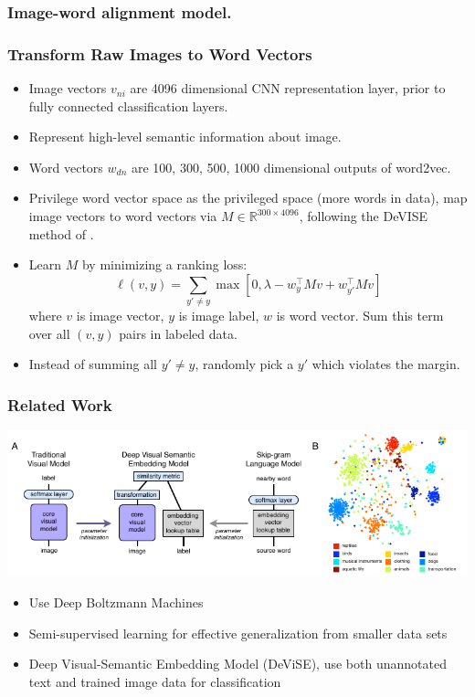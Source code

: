 \documentclass{beamer}
\begin{document}
\begin{frame}
  \frametitle{Image-word alignment model.}
\end{frame}

\begin{frame}
  \frametitle{Transform Raw Images to Word Vectors}
  \begin{itemize}
    \item Image vectors $v_{ni}$ are 4096 dimensional CNN representation layer, prior to fully connected classification layers.
    \item Represent high-level semantic information about image.
    \item Word vectors $w_{dn}$ are {100, 300, 500, 1000} dimensional outputs of word2vec.
    \item Privilege word vector space as the privileged space (more words in data), map image vectors to word vectors via $M \in \mathbb{R}^{300 \times 4096}$, following the DeVISE method of \citet{Frome13}.
    \item Learn $M$ by minimizing a ranking loss: $$\ell(v, y) = \sum_{y' \neq y} \max \left[0, \lambda - w_{y}^\top M v + w_{y'} ^\top M v \right]$$ where $v$ is image vector, $y$ is image label, $w$ is word vector. Sum this term over all $(v, y)$ pairs in labeled data.
    \item Instead of summing all $y' \neq y$, randomly pick a $y'$ which violates the margin.
  \end{itemize}
\end{frame}

\begin{frame}
  \frametitle{Related Work}
  \begin{center}
    \includegraphics[width=\textwidth]{assets/devise.pdf}
  \end{center}

  \begin{itemize}
    \item Use Deep Boltzmann Machines \citep{Srivastava14}
    \item Semi-supervised learning for effective generalization from smaller data sets \citep{Kingma14b}
    \item Deep Visual-Semantic Embedding Model (DeViSE), use both unannotated text and trained image data for classification \citep{Frome13}
  \end{itemize}
\end{frame}
\end{document}
